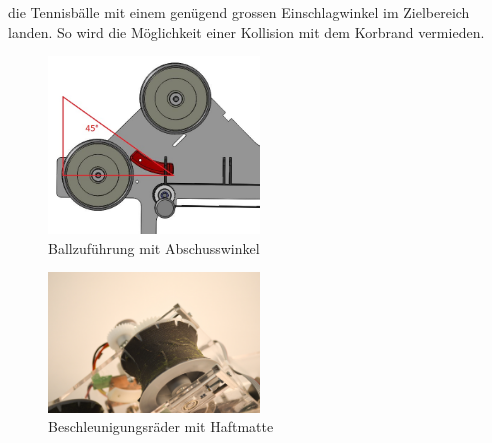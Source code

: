     die Tennisbälle mit einem genügend grossen Einschlagwinkel im Zielbereich landen. So wird die 
    Möglichkeit einer Kollision mit dem Korbrand vermieden.
    \begin{figure}[h!]
       	\includegraphics[width=0.5\textwidth,clip,trim=20mm 5mm 0mm 5mm]
       	{Enddokumentation/Bilder/Abschuss.JPG}
       	\centering
       	\caption{Ballzuführung mit Abschusswinkel}
       	\label{abb:Abschusswinkel}
    \end{figure}
     \begin{figure}[h!]
     	\includegraphics[width=0.5\textwidth,clip,trim=20mm 0mm 0mm 5mm]
     	{Enddokumentation/Bilder/Haftmatte.JPG}
     	\centering
     	\caption{Beschleunigungsräder mit Haftmatte}
     	\label{abb:BeschleunigungsräderMitHaftmatte}
     \end{figure}
    
